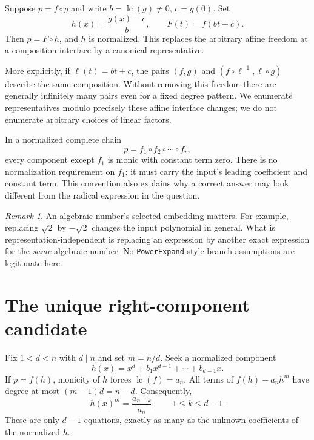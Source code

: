 \documentclass[11pt,a4paper]{article}
\numberwithin{equation}{section}
\theoremstyle{definition}
\theoremstyle{remark}
\newtheorem{remark}[theorem]{Remark}
\newcommand{\lc}{\operatorname{lc}}
\newcommand{\code}[1]{\texttt{#1}}
\begin{document}
Suppose $p=f\circ g$ and write $b=\lc(g)\ne0$, $c=g(0)$. Set
\begin{equation}
 h(x)=\frac{g(x)-c}{b},\qquad F(t)=f(bt+c).
 \label{eq:normalize}
\end{equation}
Then $p=F\circ h$, and $h$ is normalized. This replaces the arbitrary affine
freedom at a composition interface by a canonical representative.

More explicitly, if $\ell(t)=bt+c$, the pairs
$(f,g)$ and $(f\circ\ell^{-1},\ell\circ g)$ describe the same composition.
Without removing this freedom there are generally infinitely many pairs even
for a fixed degree pattern. We enumerate representatives modulo precisely
these affine interface changes; we do not enumerate arbitrary choices of
linear factors.

In a normalized complete chain
\begin{equation}
 p=f_1\circ f_2\circ\cdots\circ f_r,
 \label{eq:chain}
\end{equation}
every component except $f_1$ is monic with constant term zero. There is no
normalization requirement on $f_1$: it must carry the input's leading
coefficient and constant term. This convention also explains why a correct
answer may look different from the radical expression in the question.

\begin{remark}
An algebraic number's selected embedding matters. For example, replacing
$\sqrt2$ by $-\sqrt2$ changes the input polynomial in general. What is
representation-independent is replacing an expression by another exact
expression for the \emph{same} algebraic number. No \code{PowerExpand}-style
branch assumptions are legitimate here.
\end{remark}

\section{The unique right-component candidate}
\label{sec:candidate}
Fix $1<d<n$ with $d\mid n$ and set $m=n/d$. Seek a normalized component
\begin{equation}
 h(x)=x^d+b_1x^{d-1}+\cdots+b_{d-1}x.
 \label{eq:h}
\end{equation}
If $p=f(h)$, monicity of $h$ forces $\lc(f)=a_n$. All terms of
$f(h)-a_nh^m$ have degree at most $(m-1)d=n-d$. Consequently,
\begin{equation}
 [x^{n-k}]h(x)^m=\frac{a_{n-k}}{a_n},
 \qquad 1\le k\le d-1.
 \label{eq:topcongruence}
\end{equation}
These are only $d-1$ equations, exactly as many as the unknown coefficients
of the normalized $h$.
\end{document}
